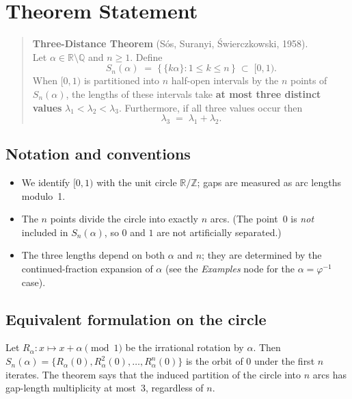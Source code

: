 \section*{Theorem Statement}

\begin{quote}
\textbf{Three-Distance Theorem} (S\'os, Suranyi, Świerczkowski, 1958).\\
Let $\alpha \in \mathbb{R} \setminus \mathbb{Q}$ and $n \geq 1$. Define
\[
  S_n(\alpha) \;=\; \bigl\{\, \{k\alpha\} : 1 \le k \le n \,\bigr\} \;\subset\; [0,1).
\]
When $[0,1)$ is partitioned into $n$ half-open intervals by the $n$ points of
$S_n(\alpha)$, the lengths of these intervals take \textbf{at most three distinct
values} $\lambda_1 < \lambda_2 < \lambda_3$. Furthermore, if all three values
occur then
\[
  \lambda_3 \;=\; \lambda_1 + \lambda_2.
\]
\end{quote}

\subsection*{Notation and conventions}

\begin{itemize}
  \item We identify $[0,1)$ with the unit circle $\mathbb{R}/\mathbb{Z}$; gaps
        are measured as arc lengths modulo~1.
  \item The $n$ points divide the circle into exactly $n$ arcs. (The point~$0$
        is \emph{not} included in $S_n(\alpha)$, so $0$ and $1$ are not
        artificially separated.)
  \item The three lengths depend on both $\alpha$ and $n$; they are determined
        by the continued-fraction expansion of $\alpha$ (see the \emph{Examples}
        node for the $\alpha = \varphi^{-1}$ case).
\end{itemize}

\subsection*{Equivalent formulation on the circle}

Let $R_\alpha : x \mapsto x + \alpha \pmod{1}$ be the irrational rotation by
$\alpha$. Then $S_n(\alpha) = \{R_\alpha(0), R_\alpha^2(0), \ldots, R_\alpha^n(0)\}$
is the orbit of $0$ under the first $n$ iterates. The theorem says that the
induced partition of the circle into $n$ arcs has gap-length multiplicity at
most~3, regardless of $n$.
